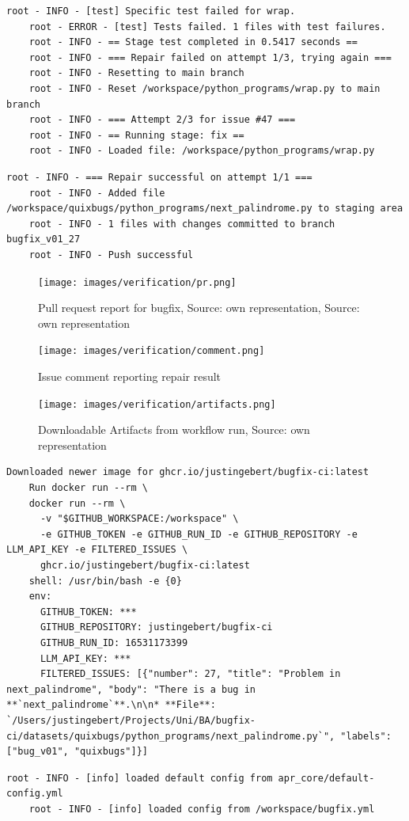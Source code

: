 \begin{lstlisting}[style=log, caption={Iterative patch generation log excerpt}, label={fig:retry}]
    root - INFO - [test] Specific test failed for wrap.
    root - ERROR - [test] Tests failed. 1 files with test failures.
    root - INFO - == Stage test completed in 0.5417 seconds ==
    root - INFO - === Repair failed on attempt 1/3, trying again ===
    root - INFO - Resetting to main branch
    root - INFO - Reset /workspace/python_programs/wrap.py to main branch
    root - INFO - === Attempt 2/3 for issue #47 ===
    root - INFO - == Running stage: fix ==
    root - INFO - Loaded file: /workspace/python_programs/wrap.py
\end{lstlisting}

\begin{lstlisting}[style=log, caption={Branch and commit created for bugfix}, label={lst:branch-commit}]
    root - INFO - === Repair successful on attempt 1/1 ===
    root - INFO - Added file /workspace/quixbugs/python_programs/next_palindrome.py to staging area
    root - INFO - 1 files with changes committed to branch bugfix_v01_27
    root - INFO - Push successful
\end{lstlisting}


\begin{figure}[H]
    \centering
    \texttt{[image: images/verification/pr.png]}
    \caption{Pull request report for bugfix, Source: own representation, Source: own representation}
    \label{fig:pr-report}
\end{figure}

\begin{figure}[H]
    \centering
    \texttt{[image: images/verification/comment.png]}
    \caption{Issue comment reporting repair result}
    \label{fig:comment}
\end{figure}

\begin{figure}[H]
    \centering
    \texttt{[image: images/verification/artifacts.png]}
    \caption{Downloadable Artifacts from workflow run, Source: own representation}
    \label{fig:logs-artifacts}
\end{figure}

\begin{lstlisting}[style=log, caption={Docker container runtime log excerpt}, label={lst:docker-log}]
    Downloaded newer image for ghcr.io/justingebert/bugfix-ci:latest
    Run docker run --rm \
    docker run --rm \
      -v "$GITHUB_WORKSPACE:/workspace" \
      -e GITHUB_TOKEN -e GITHUB_RUN_ID -e GITHUB_REPOSITORY -e LLM_API_KEY -e FILTERED_ISSUES \
      ghcr.io/justingebert/bugfix-ci:latest
    shell: /usr/bin/bash -e {0}
    env:
      GITHUB_TOKEN: ***
      GITHUB_REPOSITORY: justingebert/bugfix-ci
      GITHUB_RUN_ID: 16531173399
      LLM_API_KEY: ***
      FILTERED_ISSUES: [{"number": 27, "title": "Problem in next_palindrome", "body": "There is a bug in **`next_palindrome`**.\n\n* **File**: `/Users/justingebert/Projects/Uni/BA/bugfix-ci/datasets/quixbugs/python_programs/next_palindrome.py`", "labels": ["bug_v01", "quixbugs"]}]
\end{lstlisting}

\begin{lstlisting}[style=log, caption={Load custom configuration}, label={lst:load-config}]
    root - INFO - [info] loaded default config from apr_core/default-config.yml
    root - INFO - [info] loaded config from /workspace/bugfix.yml
\end{lstlisting}